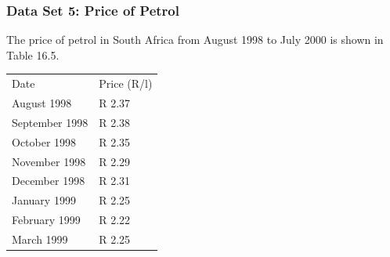 \begin{description}[noitemsep]
\begin{description}[noitemsep]
            \subsubsection{ Data Set 5: Price of Petrol}
            \nopagebreak
        \label{m39403*id206845}The price of petrol in South Africa from August 1998 to July 2000 is shown in Table 16.5.\par 
          \begin{table}[H]
        \begin{center}
      \label{m39403*uid33}
    \noindent
      \tablelasttail{}
      \begin{xtabular}[t]{|l|l|}\hline
        Date &
        Price (R/l)%
     \tabularnewline{}
        August 1998 &
        R 2.37%
     \tabularnewline{}
        September 1998 &
        R 2.38%
     \tabularnewline{}
        October 1998 &
        R 2.35%
     \tabularnewline{}
        November 1998 &
        R 2.29%
     \tabularnewline{}
        December 1998 &
        R 2.31%
     \tabularnewline{}
        January 1999 &
        R 2.25%
     \tabularnewline{}
        February 1999 &
        R 2.22%
     \tabularnewline{}
        March 1999 &
        R 2.25%
     \tabularnewline{}

\end{xtabular}
\end{center}
\end{table}
\end{description}
\end{description}
